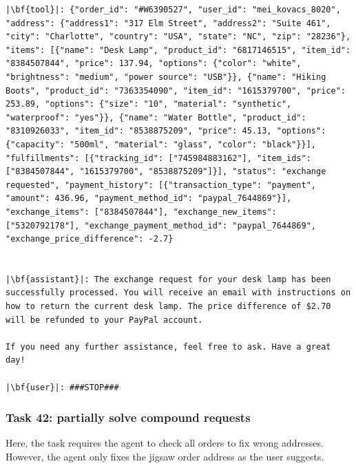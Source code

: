 \begin{longlisting}
\begin{verbatim}
|\bf{tool}|: {"order_id": "#W6390527", "user_id": "mei_kovacs_8020", "address": {"address1": "317 Elm Street", "address2": "Suite 461", "city": "Charlotte", "country": "USA", "state": "NC", "zip": "28236"}, "items": [{"name": "Desk Lamp", "product_id": "6817146515", "item_id": "8384507844", "price": 137.94, "options": {"color": "white", "brightness": "medium", "power source": "USB"}}, {"name": "Hiking Boots", "product_id": "7363354090", "item_id": "1615379700", "price": 253.89, "options": {"size": "10", "material": "synthetic", "waterproof": "yes"}}, {"name": "Water Bottle", "product_id": "8310926033", "item_id": "8538875209", "price": 45.13, "options": {"capacity": "500ml", "material": "glass", "color": "black"}}], "fulfillments": [{"tracking_id": ["745984883162"], "item_ids": ["8384507844", "1615379700", "8538875209"]}], "status": "exchange requested", "payment_history": [{"transaction_type": "payment", "amount": 436.96, "payment_method_id": "paypal_7644869"}], "exchange_items": ["8384507844"], "exchange_new_items": ["5320792178"], "exchange_payment_method_id": "paypal_7644869", "exchange_price_difference": -2.7}


|\bf{assistant}|: The exchange request for your desk lamp has been successfully processed. You will receive an email with instructions on how to return the current desk lamp. The price difference of $2.70 will be refunded to your PayPal account.

If you need any further assistance, feel free to ask. Have a great day!

|\bf{user}|: ###STOP###
\end{verbatim}
\end{longlisting}


















\newpage

\subsubsection{Task 42: partially solve compound requests} \label{sec:partially_solve}

Here, the task requires the agent to check all orders to fix wrong addresses. However, the agent only fixes the jigsaw order address as the user suggests. 

